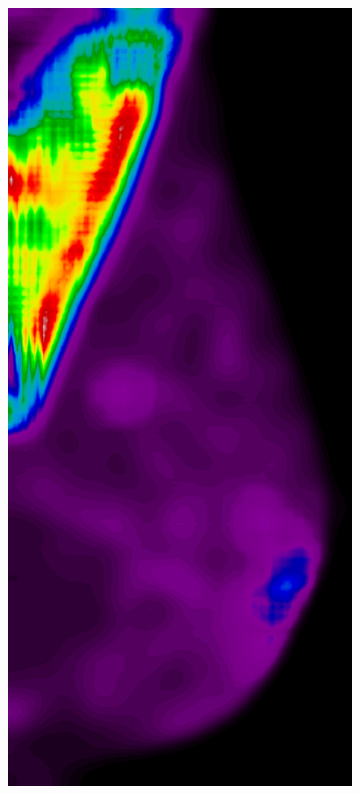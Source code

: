 \documentclass{beamer}
\begin{document}
\begin{frame}
\begin{figure}
\begin{subfigure}{0.134\textwidth}
            \end{subfigure}
            \begin{subfigure}{0.134\textwidth}
	            \centering
		            \includegraphics[width=\textwidth]{plots/examples/example4_probs_1_2.png}

\end{subfigure}
\end{figure}
\end{frame}
\end{document}
